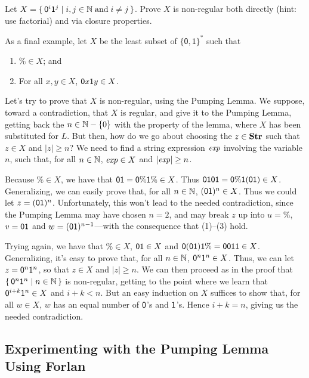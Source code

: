 \begin{exercise}
\label{RegPumpEx1}
Let $X = \{ \, \mathsf{0}^i\mathsf{1}^j \mid i,j\in\mathbb{N}\;\allowbreak\mbox{and}\allowbreak\;i\neq j \, \}$.
Prove $X$ is non-regular both directly (hint: use factorial) and
via closure properties.
\end{exercise}

As a final example, let $X$ be the least subset of
$\{\mathsf{0,1}\}^*$ such that
\begin{enumerate}[\quad(1)]
\item $\%\in X$; and

\item For all $x,y\in X$, $\mathsf{0} x\mathsf{1} y\in X$.
\end{enumerate}
Let's try to prove that $X$ is non-regular, using the Pumping Lemma.
We suppose, toward a contradiction, that $X$ is regular, and give it
to the Pumping Lemma, getting back the $n\in\mathbb{N}-\{0\}$ with the property
of the lemma, where $X$ has been substituted for $L$.  But then, how
do we go about choosing the $z\in\mathbf{Str}$ such that $z\in X$ and $|z|\geq
n$?  We need to find a string expression ${\it exp}$ involving the
variable $n$, such that, for all $n\in\mathbb{N}$, ${\it exp}\in X$
and $|{\it exp}|\geq n$.

Because $\%\in X$, we have that
$\mathsf{0}\mathsf{1}=\mathsf{0}\%\mathsf{1}\%\in X$.  Thus
$\mathsf{0}\mathsf{1}\mathsf{0}\mathsf{1}=\mathsf{0}\%\mathsf{1}(\mathsf{0}\mathsf{1})\in X$.
Generalizing, we can easily prove that, for all $n\in\mathbb{N}$,
$(\mathsf{0}\mathsf{1})^n\in X$.  Thus we could let $z=(\mathsf{0}\mathsf{1})^n$.
Unfortunately, this won't lead to the needed contradiction, since the
Pumping Lemma may have chosen $n=2$, and may break $z$
up into $u=\%$, $v=\mathsf{0}\mathsf{1}$ and $w=(\mathsf{0}\mathsf{1})^{n-1}$---with
the consequence that (1)--(3) hold.

Trying again, we have that $\%\in X$, $\mathsf{0}\mathsf{1}\in X$ and
$\mathsf{0}(\mathsf{0}\mathsf{1})\mathsf{1}\%=\mathsf{0}\mathsf{0}\mathsf{1}\mathsf{1}\in X$.
Generalizing, it's easy to prove that, for all $n\in\mathbb{N}$,
$\mathsf{0}^n\mathsf{1}^n\in X$.  Thus, we can let $z=\mathsf{0}^n\mathsf{1}^n$, so
that $z\in X$ and $|z|\geq n$.  We can then proceed as in the proof
that $\{ \, \mathsf{0}^n\mathsf{1}^n \mid n\in\mathbb{N} \, \}$ is non-regular, getting to
the point where we learn that $\mathsf{0}^{i+k}\mathsf{1}^n\in X$ and
$i+k<n$.  But an easy induction on $X$ suffices to show that, for all
$w\in X$, $w$ has an equal number of $\mathsf{0}$'s and $\mathsf{1}$'s.
Hence $i+k=n$, giving us the needed contradiction.
%
%

\subsection{Experimenting with the Pumping Lemma Using Forlan}

